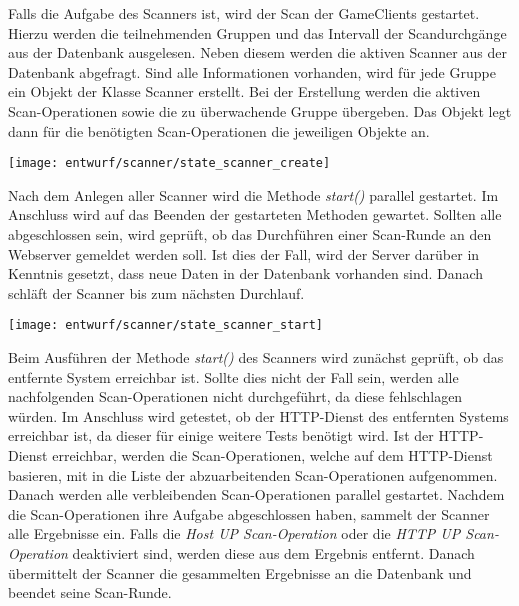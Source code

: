 Falls die Aufgabe des Scanners  ist, wird der Scan der GameClients gestartet. Hierzu werden die teilnehmenden Gruppen und das Intervall der Scandurchgänge aus der Datenbank ausgelesen. Neben diesem werden die aktiven Scanner aus der Datenbank abgefragt. Sind alle Informationen vorhanden, wird für jede Gruppe ein Objekt der Klasse Scanner erstellt. Bei der Erstellung werden die aktiven Scan-Operationen sowie die zu überwachende Gruppe übergeben. Das Objekt legt dann für die benötigten Scan-Operationen die jeweiligen Objekte an.

\begin{center}
	\texttt{[image: entwurf/scanner/state\_scanner\_create]}
	\label{fig:scanner-create-state}
\end{center}

Nach dem Anlegen aller Scanner wird die Methode \textit{start()} parallel gestartet. Im Anschluss wird auf das Beenden der gestarteten Methoden gewartet. Sollten alle abgeschlossen sein, wird geprüft, ob das Durchführen einer Scan-Runde an den Webserver gemeldet werden soll. Ist dies der Fall, wird der Server darüber in Kenntnis gesetzt, dass neue Daten in der Datenbank vorhanden sind. Danach schläft der Scanner bis zum nächsten Durchlauf.

\begin{minipage}{\textwidth}
	\texttt{[image: entwurf/scanner/state\_scanner\_start]}
\end{minipage}

Beim Ausführen der Methode \textit{start()} des Scanners wird zunächst geprüft, ob das entfernte System erreichbar ist. Sollte dies nicht der Fall sein, werden alle nachfolgenden Scan-Operationen nicht durchgeführt, da diese fehlschlagen würden. Im Anschluss wird getestet, ob der HTTP-Dienst des entfernten Systems erreichbar ist, da dieser für einige weitere Tests benötigt wird. Ist der HTTP-Dienst erreichbar, werden die Scan-Operationen, welche auf dem HTTP-Dienst basieren, mit in die Liste der abzuarbeitenden Scan-Operationen aufgenommen. Danach werden alle verbleibenden Scan-Operationen parallel gestartet. Nachdem die Scan-Operationen ihre Aufgabe abgeschlossen haben, sammelt der Scanner alle Ergebnisse ein. Falls die \textit{Host UP Scan-Operation} oder die \textit{HTTP UP Scan-Operation} deaktiviert sind, werden diese aus dem Ergebnis entfernt. Danach übermittelt der Scanner die gesammelten Ergebnisse an die Datenbank und beendet seine Scan-Runde.

